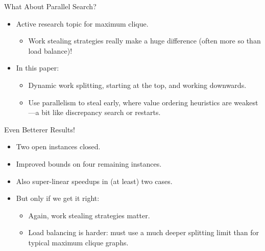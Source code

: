 \documentclass{beamer}
\begin{document}
\begin{frame}{What About Parallel Search?}
    \begin{itemize}
        \item Active research topic for maximum clique.
            \begin{itemize}
                \item Work stealing strategies really make a huge difference (often more so than
                    load balance)!
            \end{itemize}
        \item In this paper:
            \begin{itemize}
                \item Dynamic work splitting, starting at the top, and working downwards.
                \item Use parallelism to steal early, where value ordering heuristics are
                    weakest---a bit like discrepancy search or restarts.
            \end{itemize}
    \end{itemize}
\end{frame}

\begin{frame}{Even Betterer Results!}
    \begin{itemize}
        \item Two open instances closed.
        \item Improved bounds on four remaining instances.
        \item Also super-linear speedups in (at least) two cases.
        \item But only if we get it right:
            \begin{itemize}
                \item Again, work stealing strategies matter.
                \item Load balancing is harder: must use a much deeper splitting limit than for
                    typical maximum clique graphs.
            \end{itemize}
    \end{itemize}
\end{frame}
\end{document}
